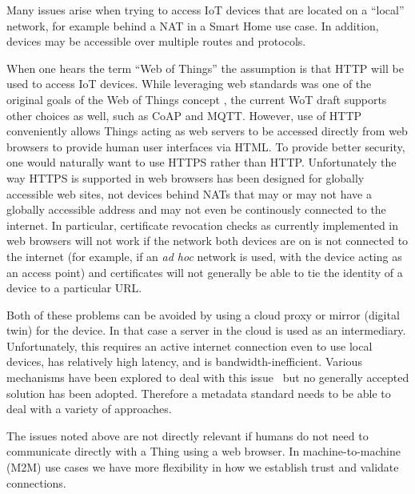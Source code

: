 Many issues arise when trying to access IoT devices
that are located on a ``local'' network,
for example behind a NAT in a Smart Home use case.
In addition, devices may be accessible over multiple
routes and protocols.

When one hears the term ``Web of Things'' the
assumption is that HTTP will be used to
access IoT devices. 
While leveraging web standards was one of the 
original goals of the Web of Things concept \cite{Ostermaier2010},
the current WoT draft supports other choices as well,
such as CoAP and MQTT.
However, use of HTTP conveniently
allows Things acting as web servers to be accessed directly
from web browsers to provide human user interfaces via HTML.  
To provide better security, one would
naturally want to use HTTPS rather than HTTP.
Unfortunately the way HTTPS is supported in web browsers has
been designed for globally accessible web sites, not devices
behind NATs that may or may not have a globally accessible
address and may not even be continously connected to the internet.
In particular, certificate revocation checks as currently 
implemented in web browsers will not work if
the network both devices are on is not connected to the internet
(for example, if an \textit{ad hoc} network is used, with the device acting as
an access point) and certificates will not generally be able 
to tie the identity of a device to a particular URL. 

Both of these problems can be avoided by using a cloud proxy
or mirror (digital twin) for the device.
In that case a server
in the cloud is used as an intermediary.
Unfortunately,
this requires an active internet connection even to use 
local devices, has relatively high latency, and is
bandwidth-inefficient.
Various mechanisms have been explored to deal with this issue~\cite{httpslocal2017}
but no generally accepted solution has been adopted.
Therefore a metadata standard needs to be able to deal with a variety
of approaches.

The issues noted above are not directly relevant if humans do not need
to communicate directly with a Thing using a web browser.  
In machine-to-machine (M2M) use cases
we have more flexibility in how we establish trust and validate connections.

